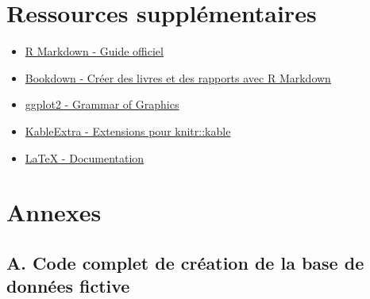 \documentclass[
]{article}
\providecommand{\tightlist}{%
  \setlength{\itemsep}{0pt}\setlength{\parskip}{0pt}}
\begin{document}
\hypertarget{ressources-suppluxe9mentaires}{%
\section{Ressources
supplémentaires}\label{ressources-suppluxe9mentaires}}

\begin{itemize}
\tightlist
\item
  \href{https://rmarkdown.rstudio.com/}{R Markdown - Guide officiel}
\item
  \href{https://bookdown.org/}{Bookdown - Créer des livres et des
  rapports avec R Markdown}
\item
  \href{https://ggplot2.tidyverse.org/}{ggplot2 - Grammar of Graphics}
\item
  \href{https://haozhu233.github.io/kableExtra/}{KableExtra - Extensions
  pour knitr::kable}
\item
  \href{https://www.latex-project.org/help/documentation/}{LaTeX -
  Documentation}
\end{itemize}

\hypertarget{annexes}{%
\section{Annexes}\label{annexes}}

\hypertarget{a.-code-complet-de-cruxe9ation-de-la-base-de-donnuxe9es-fictive}{%
\subsection{A. Code complet de création de la base de données
fictive}\label{a.-code-complet-de-cruxe9ation-de-la-base-de-donnuxe9es-fictive}}
\end{document}
